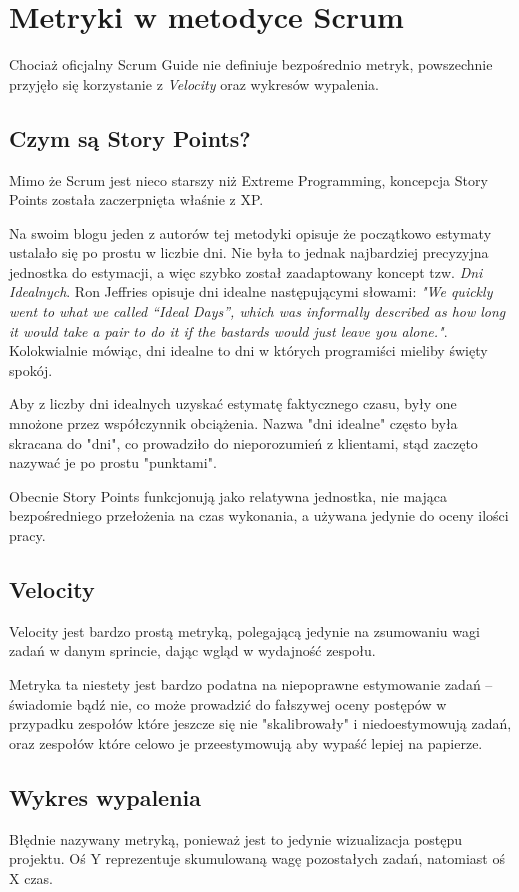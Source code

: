 \section{Metryki w metodyce Scrum}
Chociaż oficjalny Scrum Guide \cite{Schwaber2012TheSG} nie definiuje bezpośrednio metryk, powszechnie przyjęło się korzystanie z \textit{Velocity} oraz wykresów wypalenia.

\subsection{Czym są Story Points?}
Mimo że Scrum jest nieco starszy niż Extreme Programming, koncepcja Story Points została zaczerpnięta właśnie z XP.

Na swoim blogu \cite{StoryPointsRevisited} jeden z autorów tej metodyki opisuje że początkowo estymaty ustalało się po prostu w liczbie dni.
Nie była to jednak najbardziej precyzyjna jednostka do estymacji, a więc szybko został zaadaptowany koncept tzw. \textit{Dni Idealnych}.
Ron Jeffries opisuje dni idealne następującymi słowami: \textit{"We quickly went to what we called “Ideal Days”, which was informally described as how long it would take a pair to do it if the bastards would just leave you alone."}.
Kolokwialnie mówiąc, dni idealne to dni w których programiści mieliby święty spokój.

Aby z liczby dni idealnych uzyskać estymatę faktycznego czasu, były one mnożone przez współczynnik obciążenia.
Nazwa "dni idealne" często była skracana do "dni", co prowadziło do nieporozumień z klientami, stąd zaczęto nazywać je po prostu "punktami".

Obecnie Story Points funkcjonują jako relatywna jednostka, nie mająca bezpośredniego przełożenia na czas wykonania, a używana jedynie do oceny ilości pracy.

\subsection{Velocity}
Velocity jest bardzo prostą metryką, polegającą jedynie na zsumowaniu wagi zadań w danym sprincie, dając wgląd w wydajność zespołu.

Metryka ta niestety jest bardzo podatna na niepoprawne estymowanie zadań -- świadomie bądź nie, co może prowadzić do fałszywej oceny postępów w przypadku
zespołów które jeszcze się nie "skalibrowały" i niedoestymowują zadań, oraz zespołów które celowo je przeestymowują aby wypaść lepiej na papierze.

\subsection{Wykres wypalenia}
Błędnie nazywany metryką, ponieważ jest to jedynie wizualizacja postępu projektu.
Oś Y reprezentuje skumulowaną wagę pozostałych zadań, natomiast oś X czas.

